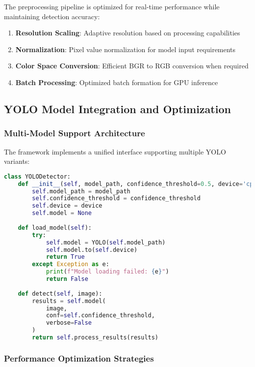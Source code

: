 \documentclass[12pt,a4paper]{article}
\begin{document}
The preprocessing pipeline is optimized for real-time performance while maintaining detection accuracy:

\begin{enumerate}
    \item \textbf{Resolution Scaling}: Adaptive resolution based on processing capabilities
    \item \textbf{Normalization}: Pixel value normalization for model input requirements
    \item \textbf{Color Space Conversion}: Efficient BGR to RGB conversion when required
    \item \textbf{Batch Processing}: Optimized batch formation for GPU inference
\end{enumerate}

\subsection{YOLO Model Integration and Optimization}

\subsubsection{Multi-Model Support Architecture}

The framework implements a unified interface supporting multiple YOLO variants:

\begin{lstlisting}[language=Python, caption=Unified YOLO Detector Interface]
class YOLODetector:
    def __init__(self, model_path, confidence_threshold=0.5, device='cpu'):
        self.model_path = model_path
        self.confidence_threshold = confidence_threshold
        self.device = device
        self.model = None
        
    def load_model(self):
        try:
            self.model = YOLO(self.model_path)
            self.model.to(self.device)
            return True
        except Exception as e:
            print(f"Model loading failed: {e}")
            return False
    
    def detect(self, image):
        results = self.model(
            image,
            conf=self.confidence_threshold,
            verbose=False
        )
        return self.process_results(results)
\end{lstlisting}

\subsubsection{Performance Optimization Strategies}
\end{document}
